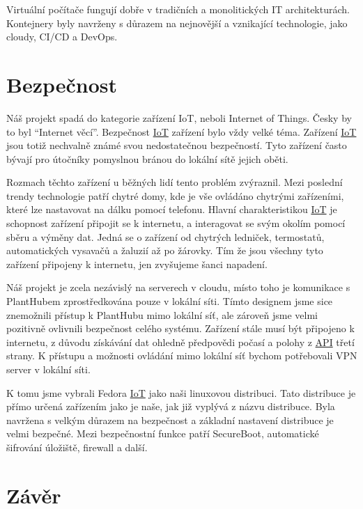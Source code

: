 \documentclass[czech,12pt,a4paper]{article}
\begin{document}
Virtuální počítače fungují dobře v tradičních a monolitických IT architekturách. Kontejnery byly navrženy s důrazem na nejnovější a vznikající technologie, jako cloudy, CI/CD a DevOps.

\clearpage

\section{Bezpečnost} \label{secBezpecnost}

Náš projekt spadá do kategorie zařízení \ac{IoT}, neboli Internet of Things. Česky by to byl \enquote{Internet věcí}. Bezpečnost \underline{\ac{IoT}} zařízení bylo vždy velké téma. Zařízení \underline{\ac{IoT}} jsou totiž nechvalně známé svou nedostatečnou bezpečností. Tyto zařízení často bývají pro útočníky pomyslnou bránou do lokální sítě jejich oběti.

Rozmach těchto zařízení u běžných lidí tento problém zvýraznil. Mezi poslední trendy technologie patří chytré domy, kde je vše ovládáno chytrými zařízeními, které lze nastavovat na dálku pomocí telefonu. Hlavní charakteristikou \underline{\ac{IoT}} je schopnost zařízení připojit se k internetu, a interagovat se svým okolím pomocí sběru a výměny dat. Jedná se o zařízení od chytrých ledniček, termostatů, automatických vysavačů a žaluzií až po žárovky. Tím že jsou všechny tyto zařízení připojeny k internetu, jen zvyšujeme šanci napadení.

Náš projekt je zcela nezávislý na serverech v cloudu, místo toho je komunikace s PlantHubem zprostředkována pouze v lokální síti. Tímto designem jsme sice znemožnili přístup k PlantHubu mimo lokální síť, ale zároveň jsme velmi pozitivně ovlivnili bezpečnost celého systému. Zařízení stále musí být připojeno k internetu, z důvodu získávání dat ohledně předpovědi počasí a polohy z \underline{\ac{API}} třetí strany. K přístupu a možnosti ovládání mimo lokální síť bychom potřebovali VPN server v lokální síti.

K tomu jsme vybrali Fedora \underline{\ac{IoT}} jako naši linuxovou distribuci. Tato distribuce je přímo určená zařízením jako je naše, jak již vyplývá z názvu distribuce. Byla navržena s velkým důrazem na bezpečnost a základní nastavení distribuce je velmi bezpečné. Mezi bezpečnostní funkce patří SecureBoot, automatické šifrování úložiště, firewall a další.

\clearpage

\section{Závěr} \label{secZaver}
\end{document}
